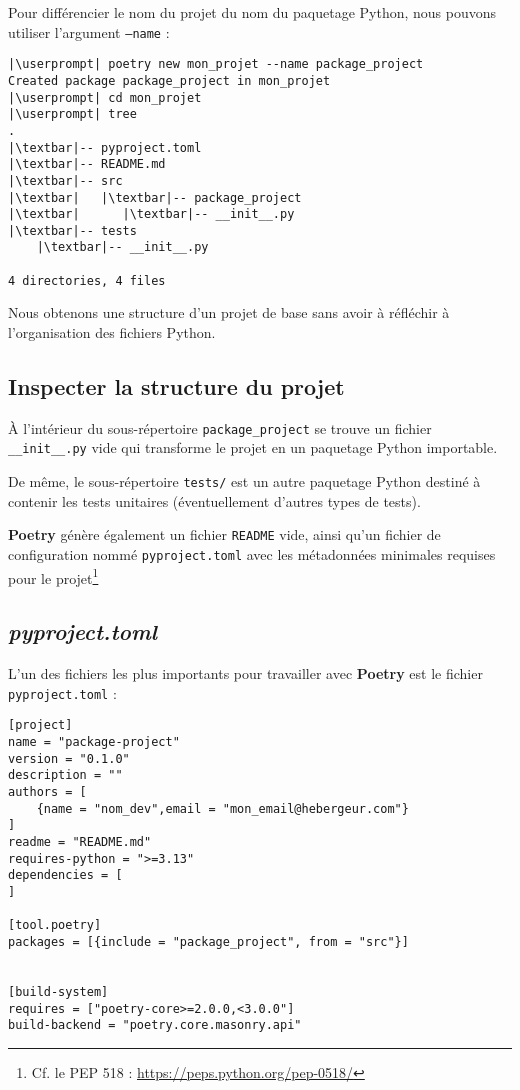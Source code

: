 Pour différencier le nom du projet du nom du paquetage Python, nous pouvons utiliser l'argument \texttt{--name} :
\begin{lstlisting}[style=bash]
|\userprompt| poetry new mon_projet --name package_project
Created package package_project in mon_projet
|\userprompt| cd mon_projet
|\userprompt| tree
.
|\textbar|-- pyproject.toml
|\textbar|-- README.md
|\textbar|-- src
|\textbar|   |\textbar|-- package_project
|\textbar|      |\textbar|-- __init__.py
|\textbar|-- tests
    |\textbar|-- __init__.py

4 directories, 4 files
\end{lstlisting}

Nous obtenons une structure d'un projet de base sans avoir à réfléchir à l'organisation des fichiers Python.

\subsection*{Inspecter la structure du projet}
À l'intérieur du sous-répertoire \texttt{package\_project} se trouve un fichier \texttt{\_\_init\_\_.py} vide qui transforme le projet en un paquetage Python importable.

De même, le sous-répertoire \texttt{tests/} est un autre paquetage Python destiné à contenir les tests unitaires (éventuellement d'autres types de tests).


\textbf{Poetry} génère également un fichier \texttt{README} vide, ainsi qu'un fichier de configuration nommé \texttt{pyproject.toml} avec les métadonnées minimales requises pour le projet\footnote{Cf. le PEP 518 : \url{https://peps.python.org/pep-0518/}}

\subsection*{\textit{pyproject.toml}}
L'un des fichiers les plus importants pour travailler avec \textbf{Poetry} est le fichier \texttt{pyproject.toml} :
\begin{lstlisting}[style=file]
[project]
name = "package-project"
version = "0.1.0"
description = ""
authors = [
    {name = "nom_dev",email = "mon_email@hebergeur.com"}
]
readme = "README.md"
requires-python = ">=3.13"
dependencies = [
]

[tool.poetry]
packages = [{include = "package_project", from = "src"}]


[build-system]
requires = ["poetry-core>=2.0.0,<3.0.0"]
build-backend = "poetry.core.masonry.api"
\end{lstlisting}

